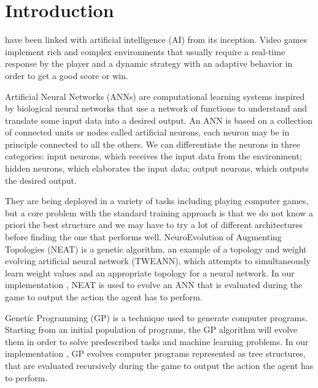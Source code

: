 \section{Introduction}
 have been linked with artificial intelligence (AI) from its inception.
Video games implement rich and complex environments that usually require a real-time
response by the player and a dynamic strategy with an adaptive behavior in order to get a
good score or win.

Artificial Neural Networks (ANNs) are computational learning systems inspired by biological
neural networks that use a network of functions to understand and translate some input data
into a desired output. An ANN is based on a collection of connected units or nodes called
artificial neurons, each neuron may be in principle connected to all the others. We can
differentiate the neurons in three categories: input neurons, which receives the input data from 
the environment; hidden neurons, which elaborates the input data; output neurons, which outputs the desired output.

They are being deployed in a variety of tasks including playing computer games, but a core
problem with the standard training approach is that we do not know a priori the best
structure and we may have to try a lot of different architectures before finding the one that
performs well. NeuroEvolution of Augmenting Topologies (NEAT) \cite{NEAT} is a genetic
algorithm, an example of a topology and weight evolving artificial neural network (TWEANN),
which attempts to simultaneously learn weight values and an appropriate topology
for a neural network. In our implementation \cite{repository}, NEAT is used to evolve an ANN that is
evaluated during the game to output the action the agent has to perform.

Genetic Programming (GP) \cite{GP} is a technique used to generate computer programs. Starting
from an initial population of programs, the GP algorithm will evolve them in order to solve
predescribed tasks and machine learning problems. In our implementation
\cite{repository}, GP evolves computer programs represented as tree structures, that are evaluated
recursively during the game to output the action the agent has to perform.
